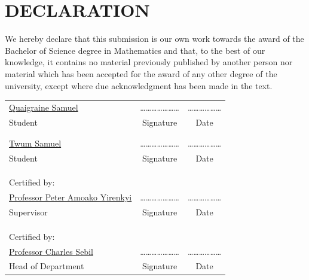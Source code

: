\chapter*{DECLARATION}

We hereby declare that this submission is our own work towards the award of the Bachelor of Science degree in Mathematics and that, to the best of our knowledge, it contains no material previously published by another person nor material which has been accepted for the award of any other degree of the university, except where due acknowledgment has been made in the text.

\vspace{1.5cm}
\begin{center}
\begin{tabular}{lcc}
\underline{Quaigraine Samuel} & \quad\quad\quad \ldots\ldots\ldots\ldots\ldots\ldots\ldots & \quad\quad\quad \ldots\ldots\ldots\ldots\ldots\ldots \\
Student & \quad\quad\quad Signature & \quad\quad\quad Date \\
& & \\
& & \\
\underline{Twum Samuel} & \quad\quad\quad \ldots\ldots\ldots\ldots\ldots\ldots\ldots & \quad\quad\quad \ldots\ldots\ldots\ldots\ldots\ldots \\
Student & \quad\quad\quad Signature & \quad\quad\quad Date \\
& & \\
& & \\
& & \\
Certified by: & & \\
\underline{Professor Peter Amoako Yirenkyi} & \quad\quad\quad \ldots\ldots\ldots\ldots\ldots\ldots\ldots & \quad\quad\quad \ldots\ldots\ldots\ldots\ldots\ldots \\
Supervisor & \quad\quad\quad Signature & \quad\quad\quad Date \\
& & \\
& & \\
& & \\
Certified by: & & \\
\underline{Professor Charles Sebil} & \quad\quad\quad \ldots\ldots\ldots\ldots\ldots\ldots\ldots & \quad\quad\quad \ldots\ldots\ldots\ldots\ldots\ldots \\
Head of Department & \quad\quad\quad Signature & \quad\quad\quad Date
\end{tabular}
\end{center}
